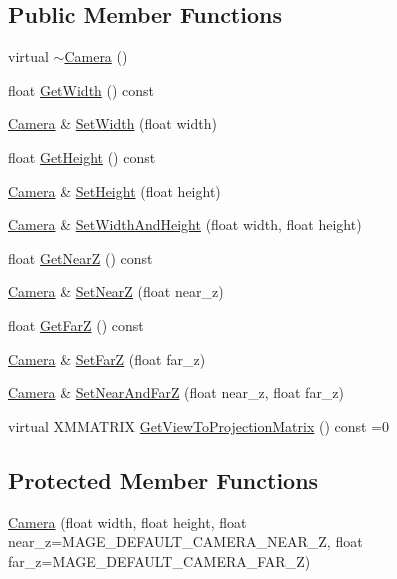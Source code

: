 \subsection*{Public Member Functions}
\begin{DoxyCompactItemize}
\item 
virtual \hyperlink{classmage_1_1_camera_ae56c0542ae1a480c7fb15d737bf16de0}{$\sim$\+Camera} ()
\item 
float \hyperlink{classmage_1_1_camera_a2285655605035118861297b2449a3443}{Get\+Width} () const
\item 
\hyperlink{classmage_1_1_camera}{Camera} \& \hyperlink{classmage_1_1_camera_acddfb1108ee8f7e937833286c082dadf}{Set\+Width} (float width)
\item 
float \hyperlink{classmage_1_1_camera_a4c6c5e96085651ce29cd6e87543d21ec}{Get\+Height} () const
\item 
\hyperlink{classmage_1_1_camera}{Camera} \& \hyperlink{classmage_1_1_camera_a83ab1d3345b3fc318608c016b6b523d9}{Set\+Height} (float height)
\item 
\hyperlink{classmage_1_1_camera}{Camera} \& \hyperlink{classmage_1_1_camera_a275b6908662c0cde4fec5485ff04a846}{Set\+Width\+And\+Height} (float width, float height)
\item 
float \hyperlink{classmage_1_1_camera_a175e3c36526a8a3e28cd2f8bd1701c55}{Get\+NearZ} () const
\item 
\hyperlink{classmage_1_1_camera}{Camera} \& \hyperlink{classmage_1_1_camera_ae2e148f1ff5128442927abc87114a739}{Set\+NearZ} (float near\+\_\+z)
\item 
float \hyperlink{classmage_1_1_camera_a7f293a8711086b3419fe3b4224ff2778}{Get\+FarZ} () const
\item 
\hyperlink{classmage_1_1_camera}{Camera} \& \hyperlink{classmage_1_1_camera_acd1ab15368f052b846f72b92a52a94c5}{Set\+FarZ} (float far\+\_\+z)
\item 
\hyperlink{classmage_1_1_camera}{Camera} \& \hyperlink{classmage_1_1_camera_a8cb00dc1b8455197412c80f321011dc1}{Set\+Near\+And\+FarZ} (float near\+\_\+z, float far\+\_\+z)
\item 
virtual X\+M\+M\+A\+T\+R\+IX \hyperlink{classmage_1_1_camera_a1f5206864cf18b5548219492556df5d2}{Get\+View\+To\+Projection\+Matrix} () const =0
\end{DoxyCompactItemize}
\subsection*{Protected Member Functions}
\begin{DoxyCompactItemize}
\item 
\hyperlink{classmage_1_1_camera_a64980217b5ae3817affab70eb3e61342}{Camera} (float width, float height, float near\+\_\+z=M\+A\+G\+E\+\_\+\+D\+E\+F\+A\+U\+L\+T\+\_\+\+C\+A\+M\+E\+R\+A\+\_\+\+N\+E\+A\+R\+\_\+Z, float far\+\_\+z=M\+A\+G\+E\+\_\+\+D\+E\+F\+A\+U\+L\+T\+\_\+\+C\+A\+M\+E\+R\+A\+\_\+\+F\+A\+R\+\_\+Z)
\end{DoxyCompactItemize}
